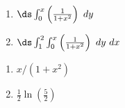 {\begin{enumerate}
	\item $\ds \int_0^{x} \left(\frac{1}{1+x^2}\right)\ dy$\\
	\item $\ds \int_1^2 \int_0^{x} \left(\frac{1}{1+x^2}\right)\ dy\ dx$
\end{enumerate}
}
{\begin{enumerate}
	\item $x/(1+x^2)$
	\item	$\frac12\ln\left(\frac52\right)$
\end{enumerate}
}
